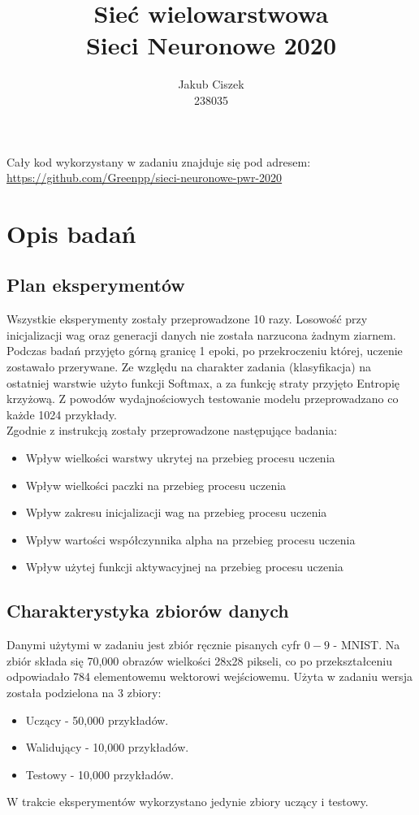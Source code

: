 \documentclass{article}
\title{  Sieć wielowarstwowa\\Sieci Neuronowe 2020 }
\author{
  Jakub Ciszek \\
  238035\\
}
\begin{document}
\maketitle

\newpage
\tableofcontents
\newpage

Cały kod wykorzystany w zadaniu znajduje się pod adresem: \url{https://github.com/Greenpp/sieci-neuronowe-pwr-2020}

\section{Opis badań}
\subsection{Plan eksperymentów}

Wszystkie eksperymenty zostały przeprowadzone 10 razy. Losowość przy inicjalizacji wag oraz generacji danych nie została narzucona żadnym ziarnem. Podczas badań przyjęto górną granicę 1 epoki, po przekroczeniu której, uczenie zostawało przerywane. Ze względu na charakter zadania (klasyfikacja) na ostatniej warstwie użyto funkcji Softmax, a za funkcję straty przyjęto Entropię krzyżową.
Z powodów wydajnościowych testowanie modelu przeprowadzano co każde 1024 przykłady.\\
Zgodnie z instrukcją zostały przeprowadzone następujące badania:
\begin{itemize}
	\item Wpływ wielkości warstwy ukrytej na przebieg procesu uczenia
	\item Wpływ wielkości paczki na przebieg procesu uczenia
	\item Wpływ zakresu inicjalizacji wag na przebieg procesu uczenia
	\item Wpływ wartości współczynnika alpha na przebieg procesu uczenia
	\item Wpływ użytej funkcji aktywacyjnej na przebieg procesu uczenia
	      	      	      	      	      	      	      	      	      	      	      	      	      	
\end{itemize}

\subsection{Charakterystyka zbiorów danych}

Danymi użytymi w zadaniu jest zbiór ręcznie pisanych cyfr \(0-9\) - MNIST. Na zbiór składa się 70,000 obrazów wielkości 28x28 pikseli, co po przekształceniu odpowiadało 784 elementowemu wektorowi wejściowemu. Użyta w zadaniu wersja została podzielona na 3 zbiory:
\begin{itemize}
	\item Uczący - 50,000 przykładów.
	\item Walidujący - 10,000 przykładów.
	\item Testowy - 10,000 przykładów.
\end{itemize}
W trakcie eksperymentów wykorzystano jedynie zbiory uczący i testowy.
\end{document}
